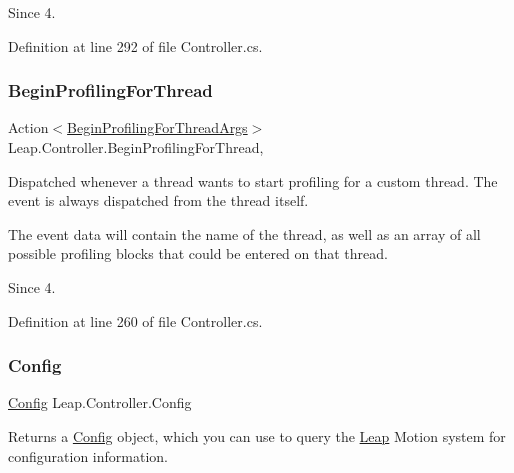 \begin{DoxySince}{Since}
4. 
\end{DoxySince}


Definition at line 292 of file Controller.\+cs.

\mbox{\label{class_leap_1_1_controller_a483c1f8ff0a5557ee0a609bfe242f01c}} 
\subsubsection{\texorpdfstring{BeginProfilingForThread}{BeginProfilingForThread}}
{\footnotesize\ttfamily Action$<$\mbox{\hyperlink{struct_leap_1_1_begin_profiling_for_thread_args}{Begin\+Profiling\+For\+Thread\+Args}}$>$ Leap.\+Controller.\+Begin\+Profiling\+For\+Thread\hspace{0.3cm}{\ttfamily [add]}, {\ttfamily [remove]}}



Dispatched whenever a thread wants to start profiling for a custom thread. The event is always dispatched from the thread itself. 

The event data will contain the name of the thread, as well as an array of all possible profiling blocks that could be entered on that thread.

\begin{DoxySince}{Since}
4. 
\end{DoxySince}


Definition at line 260 of file Controller.\+cs.

\mbox{\label{class_leap_1_1_controller_a12503273371b21d58952a99b5fc5b0d9}} 
\subsubsection{\texorpdfstring{Config}{Config}}
{\footnotesize\ttfamily \mbox{\hyperlink{class_leap_1_1_config}{Config}} Leap.\+Controller.\+Config\hspace{0.3cm}{\ttfamily [get]}}



Returns a \mbox{\hyperlink{class_leap_1_1_config}{Config}} object, which you can use to query the \mbox{\hyperlink{namespace_leap}{Leap}} Motion system for configuration information. 


